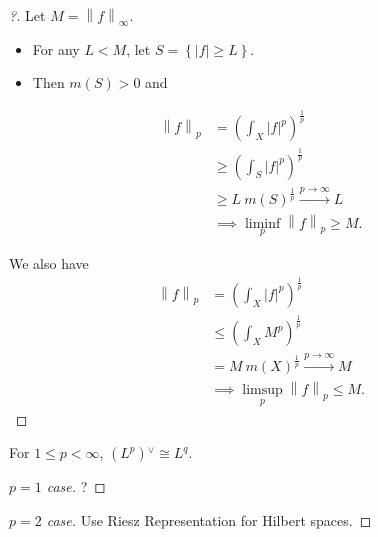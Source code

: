 \begin{proof}[?]

Let \(M = {\left\lVert {f} \right\rVert}_\infty\).

\begin{itemize}
\tightlist
\item
  For any \(L < M\), let
  \(S = \left\{{{\left\lvert {f} \right\rvert} \geq L}\right\}\).
\item
  Then \(m(S) > 0\) and
\end{itemize}

\begin{align*}
{\left\lVert {f} \right\rVert}_{p} 
&= \left( \int_X {\left\lvert {f} \right\rvert}^p \right)^{\frac 1 p} \\
&\geq \left( \int_S {\left\lvert {f} \right\rvert}^p \right)^{\frac 1 p} \\
&\geq L ~m(S)^{\frac 1 p} \overset{p\to\infty}\to L \\
&\implies \liminf_p {\left\lVert {f} \right\rVert}_{p} \geq M
.\end{align*}

We also have
\begin{align*}
{\left\lVert {f} \right\rVert}_{p} 
&=  \left( \int_X {\left\lvert {f} \right\rvert}^p \right)^{\frac 1 p} \\
&\leq \left( \int_X M^p \right)^{\frac 1 p} \\
&= M ~m(X)^{\frac 1 p} \xrightarrow{p\to\infty} M \\
&\implies \limsup_p {\left\lVert {f} \right\rVert}_{p} \leq M
.\end{align*}

\end{proof}

\begin{theorem}

For \(1\leq p< \infty\), \((L^p) {}^{ \vee }\cong L^q\).

\end{theorem}

\begin{proof}[$p=1$ case]

?

\end{proof}


\begin{proof}[$p=2$ case]

Use Riesz Representation for Hilbert spaces.

\end{proof}

